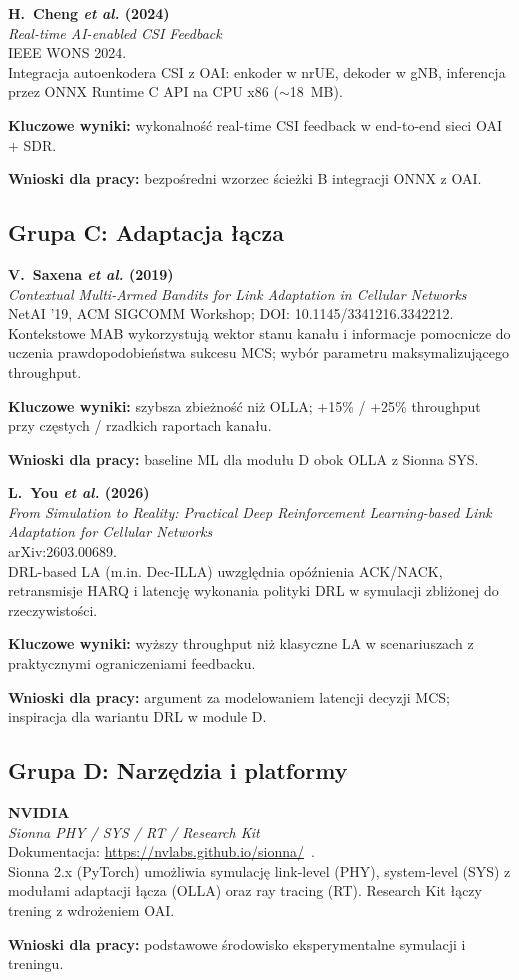 \documentclass[12pt, a4paper]{article}
\newcommand{\bibentry}[4]{%
    \textbf{#1}\\
    \textit{#2}\\
    #3\\
    \vspace{0.3em}
    #4
    \vspace{0.8em}
}
\begin{document}
\bibentry{%
    H.~Cheng \textit{et al.} (2024)}%
    {Real-time AI-enabled CSI Feedback}%
    {IEEE WONS 2024.}%
    {Integracja autoenkodera CSI z OAI: enkoder w nrUE, dekoder w gNB, inferencja przez ONNX Runtime C API na CPU x86 ($\sim$18~MB).

    \textbf{Kluczowe wyniki:} wykonalność real-time CSI feedback w end-to-end sieci OAI + SDR.

    \textbf{Wnioski dla pracy:} bezpośredni wzorzec ścieżki B integracji ONNX z OAI.}

\subsection{Grupa C: Adaptacja łącza}

\bibentry{%
    V.~Saxena \textit{et al.} (2019)}%
    {Contextual Multi-Armed Bandits for Link Adaptation in Cellular Networks}%
    {NetAI '19, ACM SIGCOMM Workshop; DOI: 10.1145/3341216.3342212.}%
    {Kontekstowe MAB wykorzystują wektor stanu kanału i informacje pomocnicze do uczenia prawdopodobieństwa sukcesu MCS; wybór parametru maksymalizującego throughput.

    \textbf{Kluczowe wyniki:} szybsza zbieżność niż OLLA; +15\% / +25\% throughput przy częstych / rzadkich raportach kanału.

    \textbf{Wnioski dla pracy:} baseline ML dla modułu D obok OLLA z Sionna SYS.}

\bibentry{%
    L.~You \textit{et al.} (2026)}%
    {From Simulation to Reality: Practical Deep Reinforcement Learning-based Link Adaptation for Cellular Networks}%
    {arXiv:2603.00689.}%
    {DRL-based LA (m.in. Dec-ILLA) uwzględnia opóźnienia ACK/NACK, retransmisje HARQ i latencję wykonania polityki DRL w symulacji zbliżonej do rzeczywistości.

    \textbf{Kluczowe wyniki:} wyższy throughput niż klasyczne LA w scenariuszach z praktycznymi ograniczeniami feedbacku.

    \textbf{Wnioski dla pracy:} argument za modelowaniem latencji decyzji MCS; inspiracja dla wariantu DRL w module D.}

\subsection{Grupa D: Narzędzia i platformy}

\bibentry{NVIDIA}{Sionna PHY / SYS / RT / Research Kit}{Dokumentacja: \url{https://nvlabs.github.io/sionna/}~\cite{sionna-phy,sionna-sys,sionna-rt,sionna-rk}.}{%
    Sionna 2.x (PyTorch) umożliwia symulację link-level (PHY), system-level (SYS) z modułami adaptacji łącza (OLLA) oraz ray tracing (RT). Research Kit łączy trening z wdrożeniem OAI.

    \textbf{Wnioski dla pracy:} podstawowe środowisko eksperymentalne symulacji i treningu.}
\end{document}
